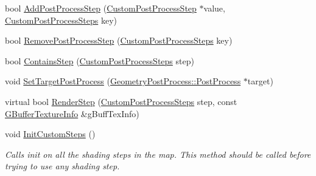 \begin{DoxyCompactItemize}
\item 
bool \mbox{\hyperlink{class_geometry_engine_1_1_custom_shading_1_1_custom_post_process_step_interface_a9505d08bc1653e9c08cdb5a06b75ffa3}{Add\+Post\+Process\+Step}} (\mbox{\hyperlink{class_geometry_engine_1_1_custom_shading_1_1_custom_post_process_step}{Custom\+Post\+Process\+Step}} $\ast$value, \mbox{\hyperlink{namespace_geometry_engine_1_1_custom_shading_a09e44ca81de5fe08c6d50271d680c4b1}{Custom\+Post\+Process\+Steps}} key)
\item 
bool \mbox{\hyperlink{class_geometry_engine_1_1_custom_shading_1_1_custom_post_process_step_interface_a539e97b28e9c5666f742ba5da4dc3b9c}{Remove\+Post\+Process\+Step}} (\mbox{\hyperlink{namespace_geometry_engine_1_1_custom_shading_a09e44ca81de5fe08c6d50271d680c4b1}{Custom\+Post\+Process\+Steps}} key)
\item 
bool \mbox{\hyperlink{class_geometry_engine_1_1_custom_shading_1_1_custom_post_process_step_interface_a1888cd07ad0378965709a3356f17f2db}{Contains\+Step}} (\mbox{\hyperlink{namespace_geometry_engine_1_1_custom_shading_a09e44ca81de5fe08c6d50271d680c4b1}{Custom\+Post\+Process\+Steps}} step)
\item 
void \mbox{\hyperlink{class_geometry_engine_1_1_custom_shading_1_1_custom_post_process_step_interface_a122afe43200a8b32100b8dea42010418}{Set\+Target\+Post\+Process}} (\mbox{\hyperlink{class_geometry_engine_1_1_geometry_post_process_1_1_post_process}{Geometry\+Post\+Process\+::\+Post\+Process}} $\ast$target)
\item 
virtual bool \mbox{\hyperlink{class_geometry_engine_1_1_custom_shading_1_1_custom_post_process_step_interface_af9faf5b1fc1583807f45d744865da7d4}{Render\+Step}} (\mbox{\hyperlink{namespace_geometry_engine_1_1_custom_shading_a09e44ca81de5fe08c6d50271d680c4b1}{Custom\+Post\+Process\+Steps}} step, const \mbox{\hyperlink{class_geometry_engine_1_1_g_buffer_texture_info}{G\+Buffer\+Texture\+Info}} \&g\+Buff\+Tex\+Info)
\item 
\mbox{\label{class_geometry_engine_1_1_custom_shading_1_1_custom_post_process_step_interface_a0f8218623247433b8836ca3de6c6188f}} 
void \mbox{\hyperlink{class_geometry_engine_1_1_custom_shading_1_1_custom_post_process_step_interface_a0f8218623247433b8836ca3de6c6188f}{Init\+Custom\+Steps}} ()
\begin{DoxyCompactList}\small\item\em Calls init on all the shading steps in the map. This method should be called before trying to use any shading step. \end{DoxyCompactList}\item 

\end{DoxyCompactItemize}
